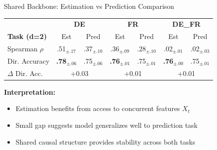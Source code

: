 \documentclass[aspectratio=169]{beamer}
\begin{document}
\begin{frame}{Shared Backbone: Estimation vs Prediction Comparison}
\begin{table}
\centering
\small
\begin{tabular}{l|cc|cc|cc}
\toprule
& \multicolumn{2}{c|}{\textbf{DE}} & \multicolumn{2}{c|}{\textbf{FR}} & \multicolumn{2}{c}{\textbf{DE\_FR}} \\
\textbf{Task (d=2)} & Est & Pred & Est & Pred & Est & Pred \\
\midrule
Spearman $\rho$ & .51$_{\pm.17}$ & .37$_{\pm.10}$ & .36$_{\pm.09}$ & .28$_{\pm.10}$ & .02$_{\pm.01}$ & .02$_{\pm.03}$ \\
Dir. Accuracy & \textbf{.78}$_{\pm.06}$ & .75$_{\pm.06}$ & \textbf{.76}$_{\pm.01}$ & .75$_{\pm.01}$ & \textbf{.76}$_{\pm.00}$ & .75$_{\pm.01}$ \\
\midrule
$\Delta$ Dir. Acc. & \multicolumn{2}{c|}{\textcolor{reprogreen}{+0.03}} & \multicolumn{2}{c|}{\textcolor{reprogreen}{+0.01}} & \multicolumn{2}{c}{\textcolor{reprogreen}{+0.01}} \\
\bottomrule
\end{tabular}
\end{table}

\vspace{0.3cm}
\begin{center}
\end{center}

\vspace{0.2cm}
\textbf{Interpretation:}
\begin{itemize}
    \item Estimation benefits from access to concurrent features $X_t$
    \item Small gap suggests model generalizes well to prediction task
    \item Shared causal structure provides stability across both tasks
\end{itemize}
\end{frame}
\end{document}
